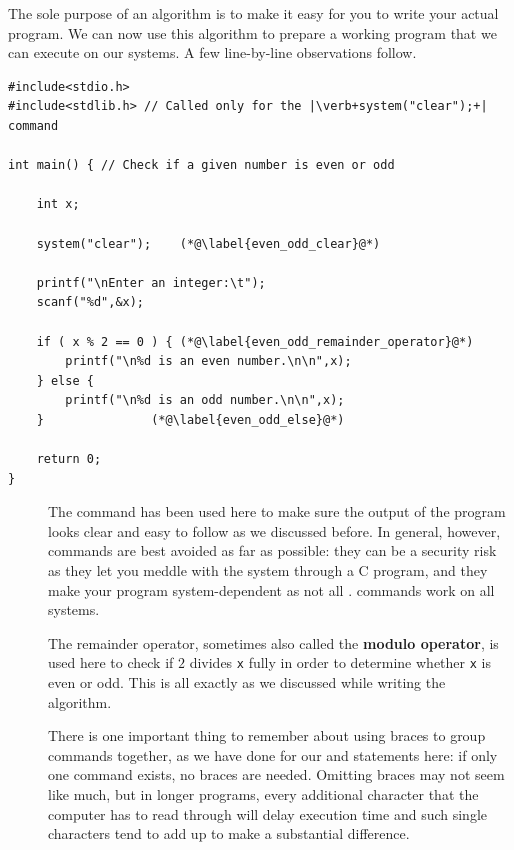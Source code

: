 \documentclass[11pt,oneside]{article}
\begin{document}
{{{{{{{{The sole purpose of an algorithm is to make it easy for you to write your actual program. We can now use this algorithm to prepare a working program that we can execute on our systems. A few line-by-line observations follow.\vspace{-.25cm}
\begin{lstlisting}
#include<stdio.h>
#include<stdlib.h> // Called only for the |\verb+system("clear");+| command

int main() { // Check if a given number is even or odd
    
    int x;
    
    system("clear");	(*@\label{even_odd_clear}@*)
    
    printf("\nEnter an integer:\t");
    scanf("%d",&x);
    
    if ( x % 2 == 0 ) {	(*@\label{even_odd_remainder_operator}@*)
        printf("\n%d is an even number.\n\n",x);
    } else {			
        printf("\n%d is an odd number.\n\n",x);
    }				(*@\label{even_odd_else}@*)
    
    return 0;
}
\end{lstlisting}
\vspace{-.5cm}
\begin{description}
\item[] The  command has been used here to make sure the output of the program looks clear and easy to follow as we discussed before. In general, however,  commands are best avoided as far as possible: they can be a security risk as they let you meddle with the system through a C program, and they make your program system-dependent as not all . commands work on all systems.

\item[] The remainder operator, sometimes also called the \textbf{modulo operator}, is used here to check if $2$ divides \verb+x+ fully in order to determine whether \verb+x+ is even or odd. This is all exactly as we discussed while writing the algorithm.

\item[] There is one important thing to remember about using braces to group commands together, as we have done for our  and  statements here: if only one command exists, no braces are needed. Omitting braces may not seem like much, but in longer programs, every additional character that the computer has to read through will delay execution time and such single characters tend to add up to make a substantial difference.


\end{description}}}}}}}}}
\end{document}

